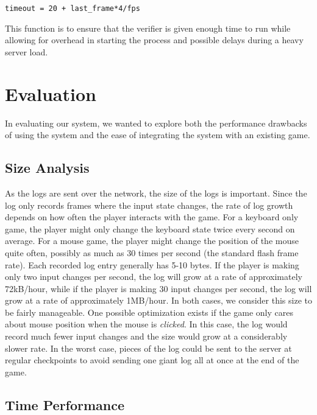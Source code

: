 \documentclass [11pt, twocolumn] {article}
\begin{document}
\begin{verbatim}
timeout = 20 + last_frame*4/fps
\end{verbatim}

This function is to ensure that the verifier is given enough time to run while allowing for overhead in starting the process and possible delays during a heavy server load. 


\section { Evaluation } 
\label{sec:evaluation}

In evaluating our system, we wanted to explore both the performance drawbacks of using the system and the ease of integrating the system with an existing game. 

\subsection {Size Analysis} 

As the logs are sent over the network, the size of the logs is important. Since the log only records frames where the input state changes, the rate of log growth depends on how often the player interacts with the game. For a keyboard only game, the player might only change the keyboard state twice every second on average. For a mouse game, the player might change the position of the mouse quite often, possibly as much as 30 times per second (the standard flash frame rate). Each recorded log entry generally has 5-10 bytes. If the player is making only two input changes per second, the log will grow at a rate of approximately 72kB/hour, while if the player is making 30 input changes per second, the log will grow at a rate of approximately 1MB/hour. In both cases, we consider this size to be fairly manageable. One possible optimization exists if the game only cares about mouse position when the mouse is \emph{clicked}. In this case, the log would record much fewer input changes and the size would grow at a considerably slower rate. In the worst case, pieces of the log could be sent to the server at regular checkpoints to avoid sending one giant log all at once at the end of the game. 

\subsection {Time Performance} 
\end{document}
